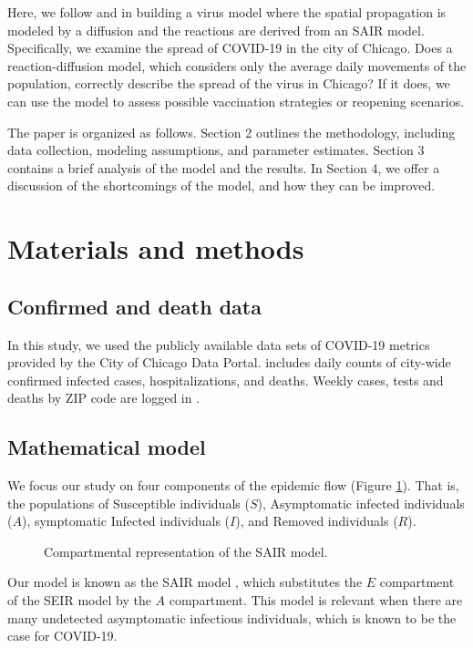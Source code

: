\documentclass[11pt]{article}
\begin{document}
	Here, we follow \cite{Kevrekidis-2021} and \cite{Mammeri+2020+102+113} in building a virus model where the spatial propagation is modeled by a diffusion and the reactions are derived from an SAIR model.
	Specifically, we examine the spread of COVID-19 in the city of Chicago.
	Does a reaction-diffusion model, which considers only the average daily movements of the population, correctly describe the spread of the virus in Chicago?
	If it does, we can use the model to assess possible vaccination strategies or reopening scenarios.
	
	The paper is organized as follows.
	Section 2 outlines the methodology, including data collection, modeling assumptions, and parameter estimates.
	Section 3 contains a brief analysis of the model and the results.
	In Section 4, we offer a discussion of the shortcomings of the model, and how they can be improved.

\section{Materials and methods}
	\subsection{Confirmed and death data}
		In this study, we used the publicly available data sets of COVID-19 metrics provided by the City of Chicago Data Portal.
		\cite{Chicago-cases} includes daily counts of city-wide confirmed infected cases, hospitalizations, and deaths.
		Weekly cases, tests and deaths by ZIP code are logged in \cite{Chicago-zips}.
	
	\subsection{Mathematical model}
		We focus our study on four components of the epidemic flow (Figure \ref{fig:model}).
		That is, the populations of Susceptible individuals ($S$), Asymptomatic infected individuals ($A$), symptomatic Infected individuals ($I$), and Removed individuals ($R$).
		\begin{figure}[h]
			\centering
			\caption{Compartmental representation of the SAIR model.}
			\label{fig:model}
		\end{figure}
		Our model is known as the SAIR model \cite{s+t+spain}, which substitutes the $E$ compartment of the SEIR model by the $A$ compartment.
		This model is relevant when there are many undetected asymptomatic infectious individuals, which is known to be the case for COVID-19.
		
\end{document}
